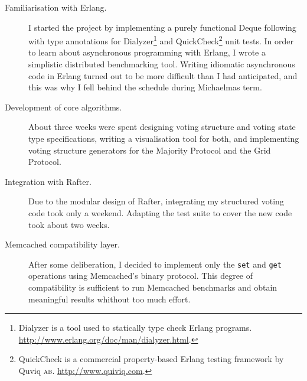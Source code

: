 \documentclass[11pt]{scrartcl}
\begin{document}
\begin{description}
    \item[Familiarisation with Erlang.] I started the project by implementing a purely functional Deque following \cite{okasaki} with type annotations for Dialyzer\footnote{Dialyzer is a tool used to statically type check Erlang programs. \url{http://www.erlang.org/doc/man/dialyzer.html}.} and QuickCheck\footnote{QuickCheck is a commercial property-based Erlang testing framework by Quviq \textsc{ab}. \url{http://www.quiviq.com}.} unit tests. In order to learn about asynchronous programming with Erlang, I wrote a simplistic distributed benchmarking tool. Writing idiomatic asynchronous code in Erlang turned out to be more difficult than I had anticipated, and this was why I fell behind the schedule during Michaelmas term.
    \item[Development of core algorithms.] About three weeks were spent designing voting structure and voting state type specifications, writing a visualisation tool for both, and implementing voting structure generators for the Majority Protocol and the Grid Protocol.
    \item[Integration with Rafter.] Due to the modular design of Rafter, integrating my structured voting code took only a weekend. Adapting the test suite to cover the new code took about two weeks.
    \item[Memcached compatibility layer.] After some deliberation, I decided to implement only the \texttt{set} and \texttt{get} operations using Memcached's binary protocol. This degree of compatibility is sufficient to run Memcached benchmarks and obtain meaningful results whithout too much effort.
\end{description}



\end{document}
